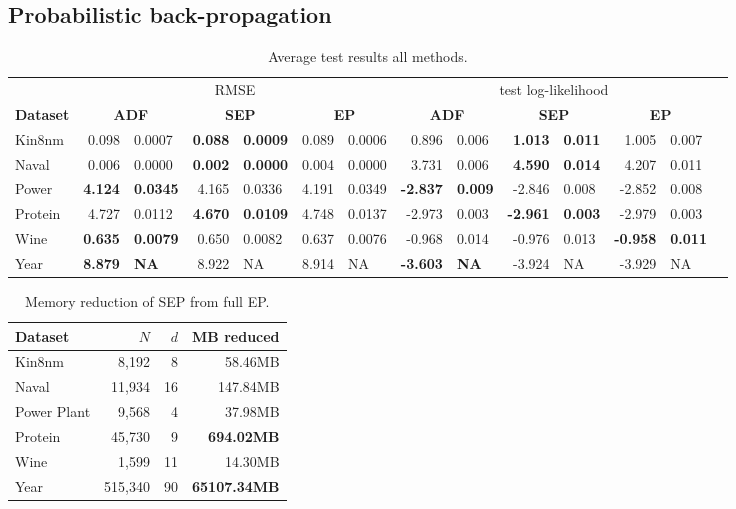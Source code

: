 \subsection{Probabilistic back-propagation}

\begin{table} 
\small
\centering \caption{ Average test results all methods. } \label{tab:results} \begin{tabular}{l@{\ica}r@{$\pm$}l@{\ica}r@{$\pm$}l@{\ica}r@{$\pm$}l@{\ica}r@{$\pm$}l@{\ica}r@{$\pm$}l@{\ica}r@{$\pm$}l@{\ica}r@{$\pm$}}\hline 
{} & \multicolumn{6}{c}{RMSE} & \multicolumn{6}{c}{test log-likelihood} \\
\bf{Dataset}&\multicolumn{2}{c}{\bf{ ADF }}&\multicolumn{2}{c}{\bf{ SEP }}&\multicolumn{2}{c}{\bf{ EP }} &\multicolumn{2}{c}{\bf{ ADF }}&\multicolumn{2}{c}{\bf{ SEP }}&\multicolumn{2}{c}{\bf{ EP }} \\ \hline 
%
Kin8nm&0.098&0.0007&\bf{0.088}&\bf{0.0009}&0.089&0.0006
	&0.896&0.006&\bf{1.013}&\bf{0.011}&1.005&0.007\\ 
%
Naval&0.006&0.0000&\bf{0.002}&\bf{0.0000}&0.004&0.0000
	&3.731&0.006&\bf{4.590}&\bf{0.014}&4.207&0.011\\  
%
Power&\bf{4.124}&\bf{0.0345}&4.165&0.0336&4.191&0.0349
	&\bf{-2.837}&\bf{0.009}&-2.846&0.008&-2.852&0.008\\
% 
Protein&4.727&0.0112&\bf{4.670}&\bf{0.0109}&4.748&0.0137
	&-2.973&0.003&\bf{-2.961}&\bf{0.003}&-2.979&0.003\\ 
%
Wine&\bf{0.635}&\bf{0.0079}&0.650&0.0082&0.637&0.0076
	&-0.968&0.014&-0.976&0.013&\bf{-0.958}&\bf{0.011}\\  
%
Year&\bf{8.879}&\bf{   NA}&8.922&   NA&8.914&   NA
&\bf{-3.603}&\bf{  NA}&-3.924&  NA&-3.929&  NA\\
 \hline \end{tabular} \end{table} 


\begin{table} 
\small
\centering 
\begin{tabular}{lrrr}\hline \bf{Dataset}& $N$ & $d$ & MB reduced\\ \hline 
Kin8nm & 8,192 & 8 & 58.46MB \\ 
Naval & 11,934 & 16 & 147.84MB\\ 
Power Plant & 9,568 & 4 & 37.98MB\\ 
Protein & 45,730 & 9 & \bf{694.02MB}\\ 
Wine & 1,599 & 11 & 14.30MB\\ 
Year & 515,340 & 90 & \bf{65107.34MB}\\ \hline 
\end{tabular} 
\caption{ Memory reduction of SEP from full EP. } \label{tab:memory} 
\end{table} 
%



